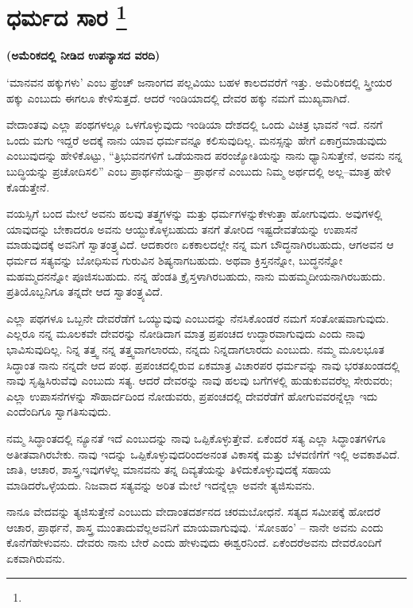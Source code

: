 
\vskip -0.5cm

\chapter[ಧರ್ಮದ ಸಾರ ]{ಧರ್ಮದ ಸಾರ \protect\footnote{}}

\centerline{\textbf{(ಅಮೆರಿಕದಲ್ಲಿ ನೀಡಿದ ಉಪನ್ಯಾಸದ ವರದಿ)}}

‘ಮಾನವನ ಹಕ್ಕುಗಳು’ ಎಂಬ ಫ್ರೆಂಚ್​ ಜನಾಂಗದ ಪಲ್ಲವಿಯು ಬಹಳ ಕಾಲದವರೆಗೆ ಇತ್ತು. ಅಮೆರಿಕದಲ್ಲಿ ಸ್ತ್ರೀಯರ ಹಕ್ಕು ಎಂಬುದು ಈಗಲೂ ಕೇಳಿಸುತ್ತದೆ. ಆದರೆ ಇಂಡಿಯಾದಲ್ಲಿ ದೇವರ ಹಕ್ಕು ನಮಗೆ ಮುಖ್ಯವಾಗಿದೆ.

ವೇದಾಂತವು ಎಲ್ಲಾ ಪಂಥಗಳಲ್ಲೂ ಒಳಗೊಳ್ಳುವುದು ಇಂಡಿಯಾ ದೇಶದಲ್ಲಿ ಒಂದು ವಿಚಿತ್ರ ಭಾವನೆ ಇದೆ. ನನಗೆ ಒಂದು ಮಗು ಇದ್ದರೆ ಅದಕ್ಕೆ ನಾನು ಯಾವ ಧರ್ಮವನ್ನೂ ಕಲಿಸುವುದಿಲ್ಲ. ಮನಸ್ಸನ್ನು ಹೇಗೆ ಏಕಾಗ್ರಮಾಡುವುದು ಎಂಬುವುದನ್ನು ಹೇಳಿಕೊಟ್ಟು, “ತ್ರಿಭುವನಗಳಿಗೆ ಒಡೆಯನಾದ ಪರಂಜ್ಯೋತಿಯನ್ನು ನಾನು ಧ್ಯಾನಿಸುತ್ತೇನೆ, ಅವನು ನನ್ನ ಬುದ್ಧಿಯನ್ನು ಪ್ರಚೋದಿಸಲಿ” ಎಂಬ ಪ್ರಾರ್ಥನೆಯನ್ನು– ಪ್ರಾರ್ಥನೆ ಎಂಬುದು ನಿಮ್ಮ ಅರ್ಥದಲ್ಲಿ ಅಲ್ಲ–ಮಾತ್ರ ಹೇಳಿ ಕೊಡುತ್ತೇನೆ.

ವಯಸ್ಸಿಗೆ ಬಂದ ಮೇಲೆ ಅವನು ಹಲವು ತತ್ತ್ವಗಳನ್ನು ಮತ್ತು ಧರ್ಮಗಳನ್ನು\break ಕೇಳುತ್ತಾ ಹೋಗುವುದು. ಅವುಗಳಲ್ಲಿ ಯಾವುದನ್ನು ಬೇಕಾದರೂ ಅವನು ಆಯ್ದುಕೊಳ್ಳ\-ಬಹುದು ತನಗೆ ತೋರಿದ ಇಷ್ಟದೇವತೆಯನ್ನು ಉಪಾಸನೆ ಮಾಡುವುದಕ್ಕೆ ಅವನಿಗೆ ಸ್ವಾತಂತ್ರ್ಯವಿದೆ. ಆದಕಾರಣ ಏಕಕಾಲದಲ್ಲೇ ನನ್ನ ಮಗ ಬೌದ್ಧನಾಗಿರಬಹುದು, ಆಗ\break ಅವನ ಆ ಧರ್ಮದ ಸತ್ಯವನ್ನು ಬೋಧಿಸುವ ಗುರುವಿನ ಶಿಷ್ಯನಾಗಬಹುದು. ಅಥವಾ ಕ್ರಿಸ್ತನನ್ನೋ, ಬುದ್ಧನನ್ನೋ ಮಹಮ್ಮದನನ್ನೋ ಪೂಜಿಸಬಹುದು. ನನ್ನ ಹೆಂಡತಿ ಕ್ರೈಸ್ತಳಾಗಿರ\break ಬಹುದು, ನಾನು ಮಹಮ್ಮದೀಯನಾಗಿರಬಹುದು. ಪ್ರತಿಯೊಬ್ಬನಿಗೂ ತನ್ನದೇ ಆದ ಸ್ವಾತಂತ್ರ್ಯವಿದೆ.

ಎಲ್ಲಾ ಪಥಗಳೂ ಒಬ್ಬನೇ ದೇವರೆಡೆಗೆ ಒಯ್ಯುವುವು ಎಂಬುದನ್ನು ನೆನಸಿಕೊಂಡರೆ ನಮಗೆ ಸಂತೋಷವಾಗುವುದು. ಎಲ್ಲರೂ ನನ್ನ ಮೂಲಕವೇ ದೇವರನ್ನು ನೋಡಿದಾಗ ಮಾತ್ರ ಪ್ರಪಂಚದ ಉದ್ಧಾರವಾಗುವುದು ಎಂದು ನಾವು ಭಾವಿಸುವುದಿಲ್ಲ. ನಿನ್ನ ತತ್ತ್ವ ನನ್ನ ತತ್ತ್ವವಾಗಲಾರದು, ನನ್ನದು ನಿನ್ನದಾಗಲಾರದು ಎಂಬುದು. ನಮ್ಮ ಮೂಲಭೂತ ಸಿದ್ಧಾಂತ ನಾನು ನನ್ನದೇ ಆದ ಪಂಥ. ಪ್ರಪಂಚದಲ್ಲಿರುವ ಏಕಮಾತ್ರ ವಿಚಾರಪರ ಧರ್ಮವನ್ನು ನಾವು ಭರತಖಂಡದಲ್ಲಿ ನಾವು ಸೃಷ್ಟಿಸಿರುವೆವು ಎಂಬುದು ಸತ್ಯ. ಆದರೆ ದೇವರನ್ನು ನಾವು ಹಲವು ಬಗೆಗಳಲ್ಲಿ ಹುಡುಕುವವರೆಲ್ಲ ಸೇರುವರು; ಎಲ್ಲಾ ಉಪಾಸನೆಗಳನ್ನು ಸೌಹಾರ್ದದಿಂದ ನೋಡುವರು, ಪ್ರಪಂಚದಲ್ಲಿ ದೇವರೆಡೆಗೆ ಹೋಗುವವರನ್ನೆಲ್ಲಾ ಇದು ಎಂದೆಂದಿಗೂ ಸ್ವಾಗತಿಸುವುದು.

ನಮ್ಮ ಸಿದ್ಧಾಂತದಲ್ಲಿ ನ್ಯೂನತೆ ಇದೆ ಎಂಬುದನ್ನು ನಾವು ಒಪ್ಪಿಕೊಳ್ಳುತ್ತೇವೆ. ಏಕೆಂದರೆ ಸತ್ಯ ಎಲ್ಲಾ ಸಿದ್ಧಾಂತಗಳಿಗೂ ಅತೀತವಾಗಿರಬೇಕು. ನಾವು ಇದನ್ನು ಒಪ್ಪಿಕೊಳ್ಳುವುದರಿಂದ\break ಅನಂತ ವಿಕಾಸಕ್ಕೆ ಮತ್ತು ಬೆಳವಣಿಗೆಗೆ ಇಲ್ಲಿ ಅವಕಾಶವಿದೆ. ಜಾತಿ, ಆಚಾರ, ಶಾಸ್ತ್ರ,\break ಇವುಗಳೆಲ್ಲ ಮಾನವನು ತನ್ನ ದಿವ್ಯತೆಯನ್ನು ತಿಳಿದುಕೊಳ್ಳುವುದಕ್ಕೆ ಸಹಾಯ ಮಾಡಿದರೆ\break ಒಳ್ಳೆಯದು. ನಿಜವಾದ ಸತ್ಯವನ್ನು ಅರಿತ ಮೇಲೆ ಇದನ್ನೆಲ್ಲಾ ಅವನೇ ತ್ಯಜಿಸುವನು.

ನಾನೂ ವೇದವನ್ನು ತ್ಯಜಿಸುತ್ತೇನೆ ಎಂಬುದು ವೇದಾಂತದರ್ಶನದ ಚರಮ\break ಬೋಧನೆ. ಸತ್ಯದ ಸಮೀಪಕ್ಕೆ ಹೋದರೆ ಆಚಾರ, ಪ್ರಾರ್ಥನೆ, ಶಾಸ್ತ್ರ ಮುಂತಾದುವೆಲ್ಲ\break ಅವನಿಗೆ ಮಾಯವಾಗುವುವು. ‘ಸೋಽಹಂ’ – ನಾನೇ ಅವನು ಎಂದು ಕೊನೆಗೆ\break ಹೇಳುವನು. ದೇವರು ನಾನು ಬೇರೆ ಎಂದು ಹೇಳುವುದು ಈಶ್ವರನಿಂದೆ. ಏಕೆಂದರೆ\break ಅವನು ದೇವರೊಂದಿಗೆ ಏಕವಾಗಿರುವನು.

